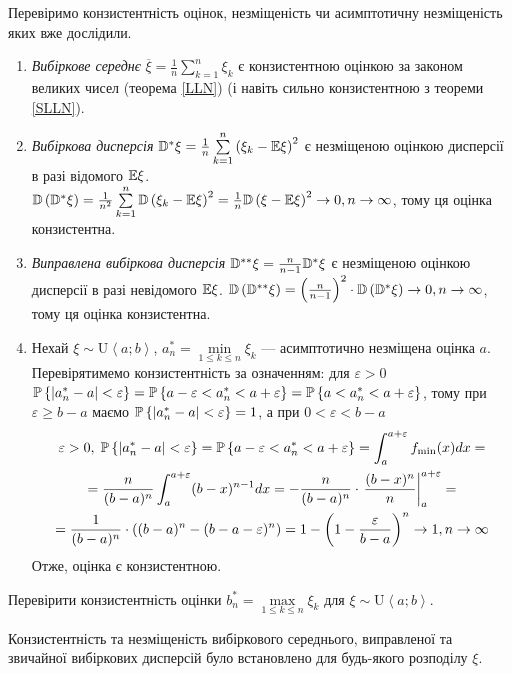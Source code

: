 \begin{example}
    Перевіримо конзистентність оцінок, незміщеність чи асимптотичну незміщеність яких вже дослідили.
    \begin{enumerate}
        \item \emph{Вибіркове середнє} $\overline{\xi} = \frac{1}{n}\sum\limits_{k=1}^n \xi_k$ є конзистентною оцінкою
        за законом великих чисел (теорема \ref{LLN}) (і навіть сильно конзистентною з теореми \ref{SLLN}).
        \item \emph{Вибіркова дисперсія} $\D^*\xi = \frac{1}{n}\sum\limits_{k=1}^n \left(\xi_k - \E\xi \right)^2$
        є незміщеною оцінкою дисперсії в разі відомого $\E\xi$. 
        $\D\left(\D^*\xi\right) = \frac{1}{n^2}\sum\limits_{k=1}^n \D\left(\xi_k - \E\xi \right)^2 =
        \frac{1}{n} \D\left(\xi - \E\xi \right)^2 \to 0, n\to\infty$, тому ця оцінка конзистентна.
        \item \emph{Виправлена вибіркова дисперсія} $\D^{**}\xi = \frac{n}{n-1} \D^*\xi$ є незміщеною оцінкою дисперсії в разі невідомого $\E\xi$. 
        $\D\left(\D^{**}\xi\right) = \left(\frac{n}{n-1} \right)^2 \cdot \D\left(\D^*\xi\right) \to 0, n\to\infty$, тому ця оцінка конзистентна.
        \item Нехай $\xi \sim \mathrm{U}\left< a; b\right>$, $a^*_n = \underset{1\leq k \leq n}{\min}\xi_k$ --- асимптотично незміщена оцінка $a$.
        Перевірятимемо конзистентність за означенням: для
       $ \varepsilon > 0$ 
       $\P\left\{|a^*_n - a| < \varepsilon\right\} = 
       \P\left\{a - \varepsilon < a^*_n < a + \varepsilon\right\} =
       \P\left\{a < a^*_n < a + \varepsilon\right\}$,
       тому при $\varepsilon \geq b-a$ маємо $\P\left\{|a^*_n - a| < \varepsilon\right\} = 1$,
       а при $0 < \varepsilon < b-a$
        \begin{gather*}
            \varepsilon > 0, \; \P\left\{|a^*_n - a| < \varepsilon\right\} = 
            \P\left\{a - \varepsilon < a^*_n < a + \varepsilon\right\} = \int_{a}^{a+\varepsilon} f_{\min}(x) dx = \\
            = \frac{n}{(b-a)^n}\int_{a}^{a+\varepsilon} (b-x)^{n-1} dx =
            -\frac{n}{(b-a)^n} \cdot \left. \frac{(b-x)^n}{n} \right|_{a}^{a+\varepsilon} = \\
            = \frac{1}{(b-a)^n} \cdot \left( (b-a)^n  - (b-a-\varepsilon)^n\right) = 
            1 - \left(1 - \frac{\varepsilon}{b-a}\right)^n \to 1, n\to\infty
        \end{gather*} 
        Отже, оцінка є конзистентною.
    \end{enumerate}
\end{example}
\begin{exercise}
    Перевірити конзистентність оцінки $b^*_n = \underset{1\leq k \leq n}{\max}\xi_k$ для $\xi \sim \mathrm{U}\left< a; b\right>$.
\end{exercise}
\begin{remark}
    Конзистентність та незміщеність вибіркового середнього, виправленої та звичайної вибіркових дисперсій було встановлено для будь-якого розподілу $\xi$.
\end{remark}

